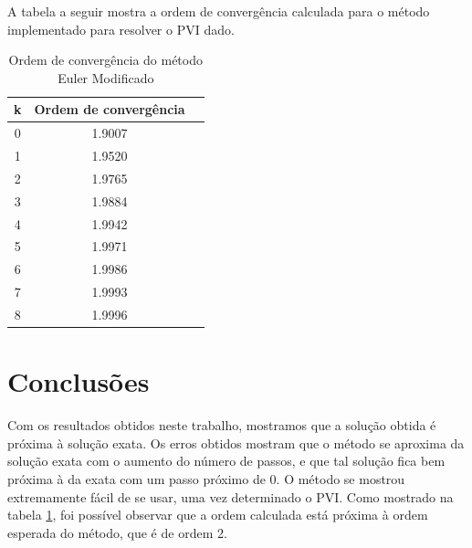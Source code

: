 \documentclass[10pt,a4paper]{article}
\begin{document}
A tabela a seguir mostra a ordem de convergência calculada para o método implementado para resolver o PVI dado.

\begin{table}[H]
\centering
\begin{tabular}{|c|c|c|}   
\hline
\textbf{k}&\textbf{Ordem de convergência}\\ 
\hline
0&1.9007 \\
1&1.9520 \\
2&1.9765\\
3&1.9884\\
4&1.9942\\
5&1.9971\\
6&1.9986\\
7&1.9993\\
8&1.9996\\
\hline
\end{tabular}
\caption{Ordem de convergência do método Euler Modificado}
\label{tab:2}
\end{table}

\section{Conclusões}
Com os resultados obtidos neste trabalho, mostramos que a solução obtida é próxima à solução exata. Os erros obtidos mostram que o método se aproxima da solução exata com o aumento do número de passos, e que tal solução fica bem próxima à da exata com um passo próximo de 0. O método se mostrou extremamente fácil de se usar, uma vez determinado o PVI. Como mostrado na tabela \ref{tab:2}, foi possível observar que a ordem calculada está próxima à ordem esperada do método, que é de ordem 2.
 
\end{document}
